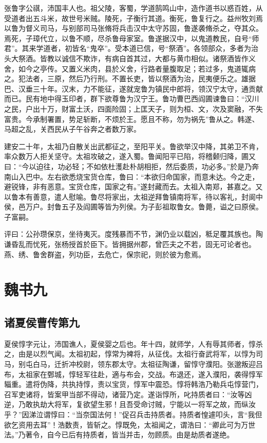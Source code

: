 \documentclass[12pt,UTF8]{ctexbook}
\begin{document}
张鲁字公祺，沛国丰人也。祖父陵，客蜀，学道鹄鸣山中，造作道书以惑百姓，从受道者出五斗米，故世号米贼。陵死，子衡行其道。衡死，鲁复行之。益州牧刘焉以鲁为督义司马，与别部司马张脩将兵击汉中太守苏固，鲁遂袭脩杀之，夺其众。焉死，子璋代立，以鲁不顺，尽杀鲁母家室。鲁遂据汉中，以鬼道教民，自号“师君”。其来学道者，初皆名“鬼卒”。受本道已信，号“祭酒”。各领部众，多者为治头大祭酒。皆教以诚信不欺诈，有病自首其过，大都与黄巾相似。诸祭酒皆作义舍，如今之亭传。又置义米肉，县於义舍，行路者量腹取足；若过多，鬼道辄病之。犯法者，三原，然后乃行刑。不置长吏，皆以祭酒为治，民夷便乐之。雄据巴、汉垂三十年。汉末，力不能征，遂就宠鲁为镇民中郎将，领汉宁太守，通贡献而已。民有地中得玉印者，群下欲尊鲁为汉宁王。鲁功曹巴西阎圃谏鲁曰：“汉川之民，户出十万，财富土沃，四面险固；上匡天子，则为桓、文，次及窦融，不失富贵。今承制署置，势足斩断，不烦於王。愿且不称，勿为祸先”鲁从之。韩遂、马超之乱，关西民从子午谷奔之者数万家。

建安二十年，太祖乃自散关出武都征之，至阳平关。鲁欲举汉中降，其弟卫不肯，率众数万人拒关坚守。太祖攻破之，遂入蜀。鲁闻阳平已陷，将稽颡归降，圃又曰：“今以迫往，功必轻；不如依杜濩赴朴胡相拒，然后委质，功必多。”於是乃奔南山入巴中。左右欲悉烧宝货仓库，鲁曰：“本欲归命国家，而意未达。今之走，避锐锋，非有恶意。宝货仓库，国家之有。”遂封藏而去。太祖入南郑，甚嘉之。又以鲁本有善意，遣人慰喻。鲁尽将家出，太祖逆拜鲁镇南将军，待以客礼，封阆中侯，邑万户。封鲁五子及阎圃等皆为列侯。为子彭祖取鲁女。鲁薨，谥之曰原侯。子富嗣。

评曰：公孙瓒保京，坐待夷灭。度残暴而不节，渊仍业以载凶，秪足覆其族也。陶谦昏乱而忧死，张杨授首於臣下。皆拥据州郡，曾匹夫之不若，固无可论者也。燕、绣、鲁舍群盗，列功臣，去危亡，保宗祀，则於彼为愈焉。

\part{魏书九}
\chapter{诸夏侯曹传第九}

夏侯惇字元让，沛国谯人，夏侯婴之后也。年十四，就师学，人有辱其师者，惇杀之，由是以烈气闻。太祖初起，惇常为裨将，从征伐。太祖行奋武将军，以惇为司马，别屯白马，迁折冲校尉，领东郡太守。太祖征陶谦，留惇守濮阳。张邈叛迎吕布，太祖家在鄄城，惇轻军往赴，適与布会，交战。布退还，遂入濮阳，袭得惇军辎重。遣将伪降，共执持惇，责以宝货，惇军中震恐。惇将韩浩乃勒兵屯惇营门，召军吏诸将，皆案甲当部不得动，诸营乃定。遂诣惇所，叱持质者曰：“汝等凶逆，乃敢执劫大将军，复欲望生邪！且吾受命讨贼，宁能以一将军之故，而纵汝乎？”因涕泣谓惇曰：“当奈国法何！”促召兵击持质者。持质者惶遽叩头，言“我但欲乞资用去耳”！浩数责，皆斩之。惇既免，太祖闻之，谓浩曰：“卿此可为万世法。”乃著令，自今已后有持质者，皆当并击，勿顾质。由是劫质者遂绝。
\end{document}
